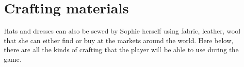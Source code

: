 \section{Crafting materials}
Hats and dresses can also be sewed by Sophie herself using fabric, leather, wool that she can either find or buy at the markets around the world.
Here below, there are all the kinds of crafting that the player will be able to use during the game.


